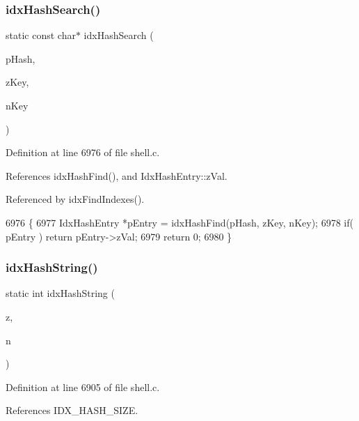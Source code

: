 \subsubsection{idx\+Hash\+Search()}
{\footnotesize\ttfamily static const char$\ast$ idx\+Hash\+Search (\begin{DoxyParamCaption}\item[{\textbf{ Idx\+Hash} $\ast$}]{p\+Hash,  }\item[{const char $\ast$}]{z\+Key,  }\item[{int}]{n\+Key }\end{DoxyParamCaption})\hspace{0.3cm}{\ttfamily [static]}}



Definition at line 6976 of file shell.\+c.



References idx\+Hash\+Find(), and Idx\+Hash\+Entry\+::z\+Val.



Referenced by idx\+Find\+Indexes().


\begin{DoxyCode}
6976                                                                             \{
6977   IdxHashEntry *pEntry = idxHashFind(pHash, zKey, nKey);
6978   \textcolor{keywordflow}{if}( pEntry ) \textcolor{keywordflow}{return} pEntry->zVal;
6979   \textcolor{keywordflow}{return} 0;
6980 \}
\end{DoxyCode}
\mbox{\label{shell_8c_a1a37f6568e04cec53eb9580f79b42282}} 
\subsubsection{idx\+Hash\+String()}
{\footnotesize\ttfamily static int idx\+Hash\+String (\begin{DoxyParamCaption}\item[{const char $\ast$}]{z,  }\item[{int}]{n }\end{DoxyParamCaption})\hspace{0.3cm}{\ttfamily [static]}}



Definition at line 6905 of file shell.\+c.



References I\+D\+X\+\_\+\+H\+A\+S\+H\+\_\+\+S\+I\+ZE.




